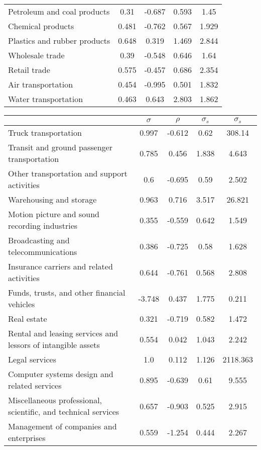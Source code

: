 \begin{table}[H]
\begin{center}
\begin{tabular}{lcccc}
Petroleum and coal products & 0.31 & -0.687 & 0.593 & 1.45 \\
Chemical products & 0.481 & -0.762 & 0.567 & 1.929 \\
Plastics and rubber products & 0.648 & 0.319 & 1.469 & 2.844 \\
Wholesale trade & 0.39 & -0.548 & 0.646 & 1.64 \\
Retail trade & 0.575 & -0.457 & 0.686 & 2.354 \\
Air transportation & 0.454 & -0.995 & 0.501 & 1.832 \\
Water transportation & 0.463 & 0.643 & 2.803 & 1.862 \\
\end{tabular}
\end{center}
\end{table}
\begin{table}[H]
\begin{center}
\begin{tabular}{lcccc}
\hline\hline
& $ \sigma$ & $\rho$ & $\sigma_s$ & $\sigma_s $ \\\hline
Truck transportation & 0.997 & -0.612 & 0.62 & 308.14 \\
Transit and ground passenger transportation & 0.785 & 0.456 & 1.838 & 4.643 \\
Other transportation and support activities & 0.6 & -0.695 & 0.59 & 2.502 \\
Warehousing and storage & 0.963 & 0.716 & 3.517 & 26.821 \\
Motion picture and sound recording industries & 0.355 & -0.559 & 0.642 & 1.549 \\
Broadcasting and telecommunications & 0.386 & -0.725 & 0.58 & 1.628 \\
Insurance carriers and related activities & 0.644 & -0.761 & 0.568 & 2.808 \\
Funds, trusts, and other financial vehicles & -3.748 & 0.437 & 1.775 & 0.211 \\
Real estate & 0.321 & -0.719 & 0.582 & 1.472 \\
Rental and leasing services and lessors of intangible assets & 0.554 & 0.042 & 1.043 & 2.242 \\
Legal services & 1.0 & 0.112 & 1.126 & 2118.363 \\
Computer systems design and related services & 0.895 & -0.639 & 0.61 & 9.555 \\
Miscellaneous professional, scientific, and technical services & 0.657 & -0.903 & 0.525 & 2.915 \\
Management of companies and enterprises & 0.559 & -1.254 & 0.444 & 2.267 \\

\end{tabular}
\end{center}
\end{table}
